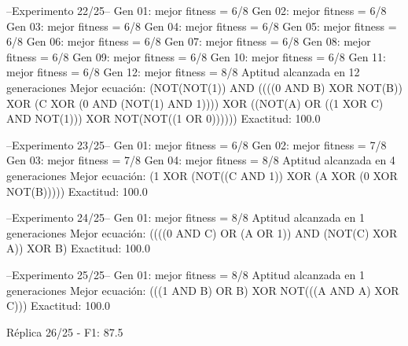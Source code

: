 --Experimento 
 22/25--
Gen 01: mejor fitness = 6/8
Gen 02: mejor fitness = 6/8
Gen 03: mejor fitness = 6/8
Gen 04: mejor fitness = 6/8
Gen 05: mejor fitness = 6/8
Gen 06: mejor fitness = 6/8
Gen 07: mejor fitness = 6/8
Gen 08: mejor fitness = 6/8
Gen 09: mejor fitness = 6/8
Gen 10: mejor fitness = 6/8
Gen 11: mejor fitness = 6/8
Gen 12: mejor fitness = 8/8
Aptitud alcanzada en 12 generaciones
Mejor ecuación: (NOT(NOT(1)) AND ((((0 AND B) XOR NOT(B)) XOR (C XOR (0 AND (NOT(1) AND 1)))) XOR ((NOT(A) OR ((1 XOR C) AND NOT(1))) XOR NOT(NOT((1 OR 0))))))
 Exactitud: 100.0%

--Experimento 
 23/25--
Gen 01: mejor fitness = 6/8
Gen 02: mejor fitness = 7/8
Gen 03: mejor fitness = 7/8
Gen 04: mejor fitness = 8/8
Aptitud alcanzada en 4 generaciones
Mejor ecuación: (1 XOR (NOT((C AND 1)) XOR (A XOR (0 XOR NOT(B)))))
 Exactitud: 100.0%

--Experimento 
 24/25--
Gen 01: mejor fitness = 8/8
Aptitud alcanzada en 1 generaciones
Mejor ecuación: ((((0 AND C) OR (A OR 1)) AND (NOT(C) XOR A)) XOR B)
 Exactitud: 100.0%

--Experimento 
 25/25--
Gen 01: mejor fitness = 8/8
Aptitud alcanzada en 1 generaciones
Mejor ecuación: (((1 AND B) OR B) XOR NOT(((A AND A) XOR C)))
 Exactitud: 100.0%

Réplica 26/25 - F1: 87.5%
